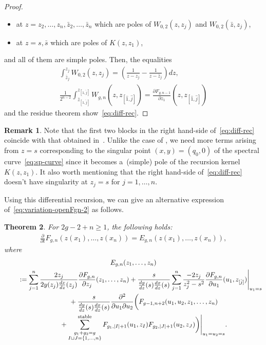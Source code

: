 \documentclass[pdftex]{sigma}
\newtheorem{thm}{Theorem}[section]
\theoremstyle{definition}
\newtheorem{rem}[thm]{Remark}
\numberwithin{equation}{section}
\def\p{\partial}
\begin{document}
\begin{proof}
\begin{itemize}
\item
at $z = z_{2}, \dots, z_{n}, \bar{z}_{2}, \dots, \bar{z}_{n}$
which are poles of $W_{0,2}(z,z_{j})$ and $W_{0,2}(\bar{z},z_{j})$,
\item
at $z = s, \bar{s}$ which are poles of $K(z,z_{1})$,
\end{itemize}
and all of them are simple poles.
Then, the equalities
\begin{gather*}
\int^{z_{j}}_{\bar{z}_{j}} W_{0,2}(z,z_{j})   =
\left(\frac{1}{z-z_{j}} - \frac{1}{z-\bar{z}_{j}} \right)dz, \\
\frac{1}{2^{n-2}}
\int^{z_{[\hat{1}, \hat{j}]}}_{\bar{z}_{[\hat{1}, \hat{j}]}}
W_{g,n}(z,z_{[\hat{1}, \hat{j}]})   =
\frac{\p F_{g,n-1}}{\p z_{1}}(z,z_{[\hat{1}, \hat{j}]})
\end{gather*}
and the residue theorem show~\eqref{eq:diff-rec}.
\end{proof}

\begin{rem} \label{rem:difference-from-DM}
Note that the f\/irst two blocks in the right hand-side
of~\eqref{eq:diff-rec} coincide with that obtained
in~\cite{DM14, DM14-2}.
Unlike the case of \cite{DM14, DM14-2},
we need more terms arising from $z=s$ corresponding
to the singular point $(x,y)=(q_{0},0)$
of the spectral curve~\eqref{eq:sp-curve}
since it becomes a~(simple) pole of
the recursion kernel $K(z,z_{1})$.
It also worth mentioning that the
right hand-side of~\eqref{eq:diff-rec} doesn't have
singularity at $z_{j} = s$ for $j=1,\dots,n$.
\end{rem}

Using this dif\/ferential recursion, we can give
an alternative expression of~\eqref{eq:variation-openFgn-2}
as follows.

\begin{thm} \label{thm:variation-of-open-free-energy}
For $2g-2+n \ge 1$, the following holds:
\begin{gather} \label{eq:t-derivative-recursion}
\frac{\p }{\p t} F_{g,n}(z(x_{1}),\dots,z(x_{n}))
= E_{g,n}(z(x_{1}),\dots,z(x_{n})),
\end{gather}
where
\begin{gather}
E_{g,n}(z_{1},\dots,z_{n}) \nonumber\\
\qquad{}
:=\sum_{j=1}^{n}
\frac{2z_{j}}{2y(z_{j})\frac{dx}{dz}(z_{j})}
\frac{\p F_{g,n}}{\p z_{j}}(z_{1},\dots,z_{n}) +
\frac{s}{\frac{dy}{dz}(s) \frac{dx}{dz}(s)}
\sum_{j=1}^{n} \frac{-2 z_{j}}{z_{j}^{2}-s^{2}}
\frac{\p F_{g,n}}{\p u_{1}}(u_{1},z_{[\hat{j}]})
\Biggr|_{u_{1}=s}
\nonumber\\
\qquad\quad{}+ \frac{s}{\frac{dy}{dz}(s) \frac{dx}{dz}(s)}
\frac{\p^{2}}{\p u_{1} \p u_{2}}
\biggl( F_{g-1,n+2}(u_{1},u_{2},z_{1},\dots,z_{n})
\nonumber\\
\qquad\quad{}+ \sum_{\substack{g_{1}+g_{2}=g \\
I \sqcup J = \{1,\dots,n\}}}^{\rm stable}
F_{g_{1}, |I|+1}(u_{1},z_{I}) F_{g_{2}, |J|+1}(u_{2}, z_{J})
\biggr)\Biggr|_{u_{1}=u_{2}=s}.\label{eq:Egn}
\end{gather}
\end{thm}
\end{document}
